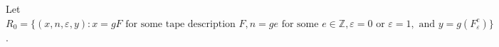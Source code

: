Let $R_0 = \{(x, n, \varepsilon, y) : x = gF \text{ for some tape description } F, n = ge \text{ for some } e \in \mathbb{Z}, \varepsilon = 0 \text{ or } \varepsilon = 1, \text{ and } y = g(F^e_\varepsilon)\}$.
